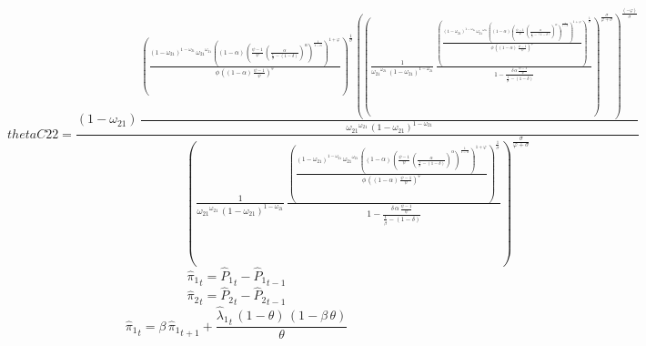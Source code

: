 \begin{dmath*}
thetaC22 = \frac{\left(1-{{\omega_{21}}}\right)\, \frac{\left(\frac{\left(1-{{\omega_{21}}}\right)^{1-{{\omega_{21}}}}\, {{\omega_{21}}}^{{{\omega_{21}}}}\, \left(\left(1-{{\alpha}}\right)\, \left(\frac{{{\psi}}-1}{{{\psi}}}\, \left(\frac{{{\alpha}}}{\frac{1}{{{\beta}}}-\left(1-{{\delta}}\right)}\right)^{{{\alpha}}}\right)^{\frac{1}{1-{{\alpha}}}}\right)^{1+{{\varphi}}}}{{{\phi}}\, \left(\left(1-{{\alpha}}\right)\, \frac{{{\psi}}-1}{{{\psi}}}\right)^{{{\varphi}}}}\right)^{\frac{1}{{{\sigma}}}}\, \left(\left(\frac{1}{{{\omega_{21}}}^{{{\omega_{21}}}}\, \left(1-{{\omega_{21}}}\right)^{1-{{\omega_{21}}}}}\, \frac{\left(\frac{\left(1-{{\omega_{21}}}\right)^{1-{{\omega_{21}}}}\, {{\omega_{21}}}^{{{\omega_{21}}}}\, \left(\left(1-{{\alpha}}\right)\, \left(\frac{{{\psi}}-1}{{{\psi}}}\, \left(\frac{{{\alpha}}}{\frac{1}{{{\beta}}}-\left(1-{{\delta}}\right)}\right)^{{{\alpha}}}\right)^{\frac{1}{1-{{\alpha}}}}\right)^{1+{{\varphi}}}}{{{\phi}}\, \left(\left(1-{{\alpha}}\right)\, \frac{{{\psi}}-1}{{{\psi}}}\right)^{{{\varphi}}}}\right)^{\frac{1}{{{\sigma}}}}}{1-\frac{{{\delta}}\, {{\alpha}}\, \frac{{{\psi}}-1}{{{\psi}}}}{\frac{1}{{{\beta}}}-\left(1-{{\delta}}\right)}}\right)^{\frac{{{\sigma}}}{{{\varphi}}+{{\sigma}}}}\right)^{\frac{\left(-{{\varphi}}\right)}{{{\sigma}}}}}{{{\omega_{21}}}^{{{\omega_{21}}}}\, \left(1-{{\omega_{21}}}\right)^{1-{{\omega_{21}}}}}}{\left(\frac{1}{{{\omega_{21}}}^{{{\omega_{21}}}}\, \left(1-{{\omega_{21}}}\right)^{1-{{\omega_{21}}}}}\, \frac{\left(\frac{\left(1-{{\omega_{21}}}\right)^{1-{{\omega_{21}}}}\, {{\omega_{21}}}^{{{\omega_{21}}}}\, \left(\left(1-{{\alpha}}\right)\, \left(\frac{{{\psi}}-1}{{{\psi}}}\, \left(\frac{{{\alpha}}}{\frac{1}{{{\beta}}}-\left(1-{{\delta}}\right)}\right)^{{{\alpha}}}\right)^{\frac{1}{1-{{\alpha}}}}\right)^{1+{{\varphi}}}}{{{\phi}}\, \left(\left(1-{{\alpha}}\right)\, \frac{{{\psi}}-1}{{{\psi}}}\right)^{{{\varphi}}}}\right)^{\frac{1}{{{\sigma}}}}}{1-\frac{{{\delta}}\, {{\alpha}}\, \frac{{{\psi}}-1}{{{\psi}}}}{\frac{1}{{{\beta}}}-\left(1-{{\delta}}\right)}}\right)^{\frac{{{\sigma}}}{{{\varphi}}+{{\sigma}}}}}
\end{dmath*}
\begin{dmath}
{{\hat{\pi}_{1}}}_{t}={{\hat{P}_{1}}}_{t}-{{\hat{P}_{1}}}_{t-1}
\end{dmath}
\begin{dmath}
{{\hat{\pi}_{2}}}_{t}={{\hat{P}_{2}}}_{t}-{{\hat{P}_{2}}}_{t-1}
\end{dmath}
\begin{dmath}
{{\hat{\pi}_{1}}}_{t}={{\beta}}\, {{\hat{\pi}_{1}}}_{t+1}+\frac{{{\hat{\lambda}_{1}}}_{t}\, \left(1-{{\theta}}\right)\, \left(1-{{\beta}}\, {{\theta}}\right)}{{{\theta}}}
\end{dmath}
